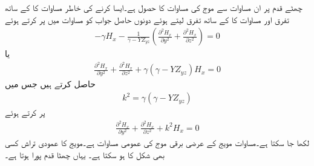 چھٹے قدم پر ان مساوات سے موج کی مساوات کا حصول ہے۔ایسا کرنے کی خاطر مساوات  کا  کے ساتھ تفرق اور مساوات  کا  کے ساتھ تفرق لیتے ہوئے دونوں حاصل جواب کو مساوات  میں پر کرتے ہوئے
\begin{align*}
-\gamma H_x-\frac{1}{\gamma -Y Z_{yz}} \left(\frac{\partial^2 H_x}{\partial y^2}+\frac{\partial^2 H_x}{\partial z^2} \right)=0
\end{align*}
یا
\begin{align*}
\frac{\partial^2 H_x}{\partial y^2}+\frac{\partial^2 H_x}{\partial z^2}+\gamma \left(\gamma-Y Z_{yz} \right)H_x =0
\end{align*}
حاصل کرتے ہیں جس میں
\begin{align}\label{مساوات_میوج_ڑ}
k^2=\gamma \left(\gamma-Y Z_{yz}\right)
\end{align}
پر کرتے ہوئے
\begin{align}\label{مساوات_میوج_ز}
\frac{\partial^2 H_x}{\partial y^2}+\frac{\partial^2 H_x}{\partial z^2}+k^2 H_x =0
\end{align}
لکھا جا سکتا ہے۔مساوات  مویج کے عرضی برقی موج کی عمومی مساوات ہے۔مویج کا عمودی تراش کسی بھی شکل کا ہو سکتا ہے۔ یہاں چھٹا قدم پورا ہوتا ہے۔

